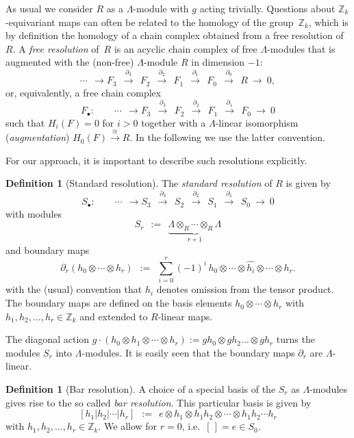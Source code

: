 \documentclass[11pt,a4paper,draft]{article}
\newcommand{\Z}{{\mathbb Z}}
\newcommand\isom{\cong}
\newcommand{\tens}{\otimes}
\newcommand{\deq}{:=}
\newcommand\xto{\xrightarrow}
\newcommand{\dd}{\partial}
\theoremstyle{definition}
\newtheorem{definition}[theorem]{Definition}
\begin{document}
As usual we consider $R$ as a $\Lambda$-module with $g$ acting trivially.
Questions about $\Z_k$-equivariant maps can often be related to the homology
of the group~$\Z_k$, which is by definition the homology of a chain complex
obtained from a free resolution of~$R$. A {\em free resolution} of~$R$ is an
acyclic chain complex of free $\Lambda$-modules
that is augmented with the (non-free) $\Lambda$-module $R$ in dimension $-1$:
\[
  \cdots\ \  \longrightarrow F_3
    \ \ \stackrel{\dd_3}{\longrightarrow}\ \ F_2
    \ \ \stackrel{\dd_2}{\longrightarrow}\ \  F_1
    \ \ \stackrel{\dd_1}{\longrightarrow}\ \  F_0
    \ \ \stackrel{\dd_0}{\longrightarrow}\ \  R \ \longrightarrow\ 0,
\]
or, equivalently, a free chain complex
\[
F_\bullet : \qquad
 \cdots\ \  \longrightarrow F_3
    \ \ \stackrel{\dd_3}{\longrightarrow}\ \ F_2
    \ \ \stackrel{\dd_2}{\longrightarrow}\ \  F_1
    \ \ \stackrel{\dd_1}{\longrightarrow}\ \  F_0\ \longrightarrow\ 0
\]
such that $H_i(F)=0$ for $i>0$ together with a $\Lambda$-linear
isomorphism ({\em augmentation}) $H_0(F)\xto\isom R$.  In the following we use the latter convention.

For our approach, it is important to describe such resolutions
explicitly.


\begin{definition}[Standard resolution] \label{def:standard}
The \emph{standard resolution} of $R$ is given by
\[
 S_\bullet : \qquad
 \cdots\ \    \longrightarrow S_3
    \ \ \stackrel{\dd_3}{\longrightarrow}\ \ S_2
    \ \ \stackrel{\dd_2}{\longrightarrow}\ \  S_1
    \ \ \stackrel{\dd_1}{\longrightarrow}\ \  S_0 \ \longrightarrow\ 0
\]
with modules
\[
    S_r   \ \ \deq\ \ \underbrace{\Lambda\tens_R\cdots\tens_R\Lambda}_{r+1}
\]
and boundary maps
\[
    \dd_r (h_0\tens\cdots\tens h_r) \ \ \deq\ \
    \sum_{i=0}^r (-1)^i\, h_0\tens\cdots\tens\widehat{h_i}\tens\cdots\tens h_r.
\]
with the (usual) convention that $\widehat{h_i}$ denotes omission from
the tensor product.  The boundary maps are defined on the basis
elements $h_0\tens\cdots\tens h_r$ with $h_1,h_2,\dots,h_r \in \Z_k$
and extended to $R$-linear maps.

The diagonal action $g \cdot (h_0 \tens h_1 \tens \cdots \tens h_r) \deq gh_0
\tens gh_2 \dots \tens gh_r$ turns the modules $S_r$ into
$\Lambda$-modules.
It is easily seen that the boundary maps $\dd_r$ are $\Lambda$-linear.
\end{definition}

\begin{definition}[Bar resolution]
A choice of a special basis of the $S_r$ as $\Lambda$-modules gives rise to the
so called \emph{bar resolution}. This particular basis is given by
\[
    [h_1|h_2|\cdots|h_r]\ \ \deq \ \
        e\tens h_1\tens h_1h_2\tens\cdots\tens h_1h_2\cdots h_r
\]
with $h_1, h_2, \dots, h_r \in \Z_k$.  We allow for $r=0$,
i.e.~$[\,]=e\in S_0$.
\end{definition}
\end{document}
